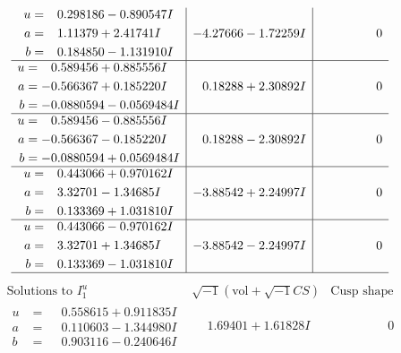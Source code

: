 \documentclass[1p]{elsarticle_modified}
\theoremstyle{definition}
\newcommand{\I}{\sqrt{-1}}
\begin{document}
$$\begin{array}{c|c|c}
\begin{aligned}
u &= \phantom{-}0.298186 - 0.890547 I \\
a &= \phantom{-}1.11379 + 2.41741 I \\
b &= \phantom{-}0.184850 - 1.131910 I\end{aligned}
 & -4.27666 - 1.72259 I & \phantom{-0.000000 } 0 \\ \hline\begin{aligned}
u &= \phantom{-}0.589456 + 0.885556 I \\
a &= -0.566367 + 0.185220 I \\
b &= -0.0880594 - 0.0569484 I\end{aligned}
 & \phantom{-}0.18288 + 2.30892 I & \phantom{-0.000000 } 0 \\ \hline\begin{aligned}
u &= \phantom{-}0.589456 - 0.885556 I \\
a &= -0.566367 - 0.185220 I \\
b &= -0.0880594 + 0.0569484 I\end{aligned}
 & \phantom{-}0.18288 - 2.30892 I & \phantom{-0.000000 } 0 \\ \hline\begin{aligned}
u &= \phantom{-}0.443066 + 0.970162 I \\
a &= \phantom{-}3.32701 - 1.34685 I \\
b &= \phantom{-}0.133369 + 1.031810 I\end{aligned}
 & -3.88542 + 2.24997 I & \phantom{-0.000000 } 0 \\ \hline\begin{aligned}
u &= \phantom{-}0.443066 - 0.970162 I \\
a &= \phantom{-}3.32701 + 1.34685 I \\
b &= \phantom{-}0.133369 - 1.031810 I\end{aligned}
 & -3.88542 - 2.24997 I & \phantom{-0.000000 } 0\\
 \hline 
 \end{array}$$\newpage$$\begin{array}{c|c|c}  
\text{Solutions to }I^u_{1}& \I (\text{vol} + \sqrt{-1}CS) & \text{Cusp shape}\\
 \hline 
\begin{aligned}
u &= \phantom{-}0.558615 + 0.911835 I \\
a &= \phantom{-}0.110603 - 1.344980 I \\
b &= \phantom{-}0.903116 - 0.240646 I\end{aligned}
 & \phantom{-}1.69401 + 1.61828 I & \phantom{-0.000000 } 0 \\ \hline\begin{aligned}

\end{aligned}
\end{array}$$
\end{document}
